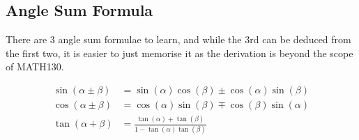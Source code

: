 \subsection{Angle Sum Formula}
\label{sec:AngleSumFormula}

There are 3 angle sum formulae to learn, and while the 3rd can be deduced from
the first two, it is easier to just memorise it as the derivation is beyond
the scope of MATH130.

\begin{align}
  \sin(\alpha \pm \beta)
    &= \sin(\alpha)\cos(\beta) \pm \cos(\alpha)\sin(\beta) \\
  \cos(\alpha \pm \beta)
    &= \cos(\alpha)\sin(\beta) \mp \cos(\beta)\sin(\alpha) \\
  \tan(\alpha + \beta)
    &= \frac{\tan(\alpha) + \tan(\beta)}{1 - \tan(\alpha)\tan(\beta)} \\
\end{align}
